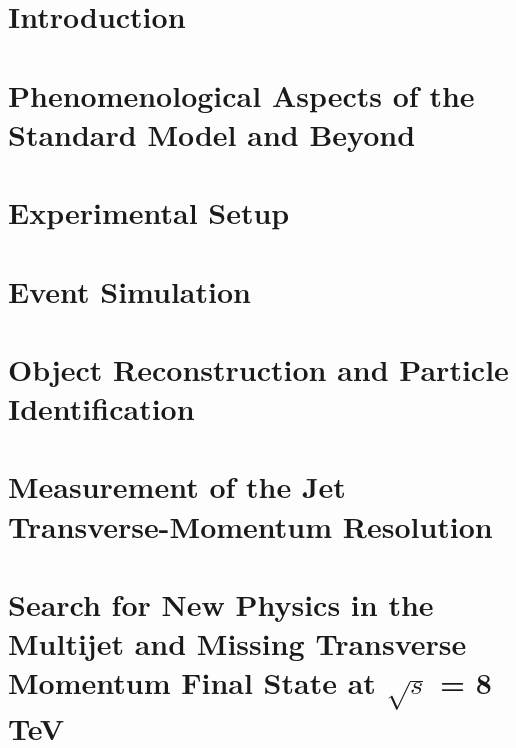 \documentclass[
twoside,
headsepline,     %
headings=normal,
openright,
numbers=noenddot, %
a4paper
]{scrreprt} %
\begin{document}
\newpage 
\thispagestyle{empty}
\quad 

\newpage
\tableofcontents

\cleardoublepage

\setcounter{page}{1}

\chapter{Introduction}


\chapter{Phenomenological Aspects of the Standard Model and Beyond} \label{chap:Theory}


\chapter{Experimental Setup} \label{chap:Detector}


\chapter{Event Simulation} \label{chap:Simulation}


\chapter{Object Reconstruction and Particle Identification} \label{chap:Objects}


\chapter{Measurement of the Jet Transverse-Momentum Resolution} \label{chap:Resolution}


\chapter[Search for New Physics with Jets and Missing Transverse Momentum]{Search for New Physics in the Multijet and Missing Transverse Momentum Final State at $\sqrt{s}$ = 8 TeV} \label{chap:RA2}

\end{document}
